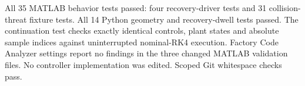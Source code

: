 All 35 MATLAB behavior tests passed: four recovery-driver tests and 31 collision-threat fixture tests. All 14 Python geometry and recovery-dwell tests passed. The continuation test checks exactly identical controls, plant states and absolute sample indices against uninterrupted nominal-RK4 execution. Factory Code Analyzer settings report no findings in the three changed MATLAB validation files. No controller implementation was edited. Scoped Git whitespace checks pass.
